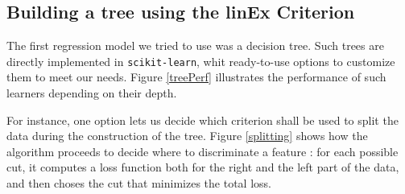 \documentclass[a4paper,10pt]{article}
\begin{document}
  \subsection{Building a tree using the linEx Criterion}

  The first regression model we tried to use was a decision tree. Such trees are directly implemented in {\tt scikit-learn}, whit ready-to-use options to customize them to meet our needs. Figure \ref{treePerf} illustrates the performance of such learners depending on their depth.

  For instance, one option lets us decide which criterion shall be used to split the data during the construction of the tree. Figure \ref{splitting} shows how the algorithm proceeds to decide where to discriminate a feature : for each possible cut, it computes a loss function both for the right and the left part of the data, and then choses the cut that minimizes the total loss.
\end{document}
